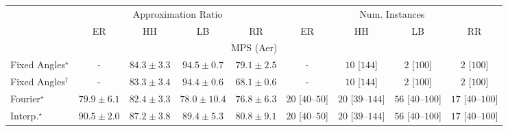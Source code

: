 \begin{tabular}{l|cccc|cccc|}
\toprule
& \multicolumn{4}{c|}{Approximation Ratio} & \multicolumn{4}{c|}{Num. Instances} \\
            & ER & HH & LB & RR & ER & HH & LB & RR \\
\midrule
\multicolumn{9}{c}{\rule{0pt}{8pt}MPS (Aer)} \\
\midrule
Fixed Angles$^\star$ & {\cellcolor[HTML]{000000}} \color[HTML]{F1F1F1} {\cellcolor{white}} \color{black} - & {\cellcolor[HTML]{8C6AB1}} \color[HTML]{F1F1F1} $84.3\pm 3.3$ & {\cellcolor[HTML]{570354}} \color[HTML]{F1F1F1} $94.5\pm 0.7$ & {\cellcolor[HTML]{93A5CE}} \color[HTML]{F1F1F1} $79.1\pm 2.5$ & {\cellcolor[HTML]{000000}} \color[HTML]{F1F1F1} {\cellcolor{white}} \color{black} - & {\cellcolor[HTML]{FFF6F2}} \color[HTML]{000000} $10$ [$144$] & {\cellcolor[HTML]{FFF7F3}} \color[HTML]{000000} $2$ [$100$] & {\cellcolor[HTML]{FFF7F3}} \color[HTML]{000000} $2$ [$100$] \\
Fixed Angles$^\dagger$ & {\cellcolor[HTML]{000000}} \color[HTML]{F1F1F1} {\cellcolor{white}} \color{black} - & {\cellcolor[HTML]{8C76B7}} \color[HTML]{F1F1F1} $83.3\pm 3.4$ & {\cellcolor[HTML]{580356}} \color[HTML]{F1F1F1} $94.4\pm 0.6$ & {\cellcolor[HTML]{E9F2F8}} \color[HTML]{000000} $68.1\pm 0.6$ & {\cellcolor[HTML]{000000}} \color[HTML]{F1F1F1} {\cellcolor{white}} \color{black} - & {\cellcolor[HTML]{FFF6F2}} \color[HTML]{000000} $10$ [$144$] & {\cellcolor[HTML]{FFF7F3}} \color[HTML]{000000} $2$ [$100$] & {\cellcolor[HTML]{FFF7F3}} \color[HTML]{000000} $2$ [$100$] \\
Fourier$^\star$ & {\cellcolor[HTML]{8F9DC9}} \color[HTML]{F1F1F1} $79.9\pm 6.1$ & {\cellcolor[HTML]{8C80BB}} \color[HTML]{F1F1F1} $82.4\pm 3.3$ & {\cellcolor[HTML]{99B1D4}} \color[HTML]{000000} $78.0\pm 10.4$ & {\cellcolor[HTML]{9FBCDA}} \color[HTML]{000000} $76.8\pm 6.3$ & {\cellcolor[HTML]{FFF3F0}} \color[HTML]{000000} $20$ [$40$--$50$] & {\cellcolor[HTML]{FFF3F0}} \color[HTML]{000000} $20$ [$39$--$144$] & {\cellcolor[HTML]{FEEBE7}} \color[HTML]{000000} $56$ [$40$--$100$] & {\cellcolor[HTML]{FFF4F0}} \color[HTML]{000000} $17$ [$40$--$100$] \\
Interp.$^\star$ & {\cellcolor[HTML]{831D85}} \color[HTML]{F1F1F1} $90.5\pm 2.0$ & {\cellcolor[HTML]{8949A1}} \color[HTML]{F1F1F1} $87.2\pm 3.8$ & {\cellcolor[HTML]{852D90}} \color[HTML]{F1F1F1} $89.4\pm 5.3$ & {\cellcolor[HTML]{8C93C4}} \color[HTML]{F1F1F1} $80.8\pm 9.1$ & {\cellcolor[HTML]{FFF3F0}} \color[HTML]{000000} $20$ [$40$--$50$] & {\cellcolor[HTML]{FFF3F0}} \color[HTML]{000000} $20$ [$39$--$144$] & {\cellcolor[HTML]{FEEBE7}} \color[HTML]{000000} $56$ [$40$--$100$] & {\cellcolor[HTML]{FFF4F0}} \color[HTML]{000000} $17$ [$40$--$100$] \\

\end{tabular}
